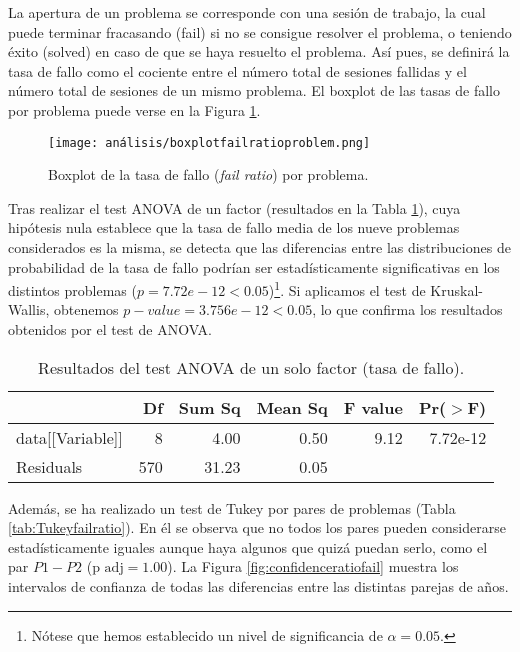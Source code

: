 La apertura de un problema se corresponde con una sesión de trabajo, la cual puede terminar fracasando (fail) si no se consigue resolver el problema, o teniendo éxito (solved) en caso de que se haya resuelto el problema. Así pues, se definirá la tasa de fallo como el cociente entre el número total de sesiones fallidas y el número total de sesiones de un mismo problema. El boxplot de las tasas de fallo por problema puede verse en la Figura \ref{fig:boxplotfailratio}.

\begin{figure}[H]
    \centering
    \texttt{[image: análisis/boxplotfailratioproblem.png]}
    \caption{Boxplot de la tasa de fallo (\emph{fail ratio}) por problema.}
    \label{fig:boxplotfailratio}
\end{figure}

Tras realizar el test ANOVA de un factor (resultados en la Tabla \ref{tab:ANOVAfailratio}), cuya hipótesis nula establece que la tasa de fallo media de los nueve problemas considerados es la misma, se detecta que las diferencias entre las distribuciones de probabilidad de la tasa de fallo  podrían ser estadísticamente significativas en los distintos problemas ($p = 7.72e-12 < 0.05$)\footnote{Nótese que hemos establecido un nivel de significancia de $\alpha = 0.05$.}. Si aplicamos el test de Kruskal-Wallis, obtenemos $p-value = 3.756e-12 < 0.05$, lo que confirma los resultados obtenidos por el test de ANOVA.

\begin{table}[H]
\centering
\caption{Resultados del test ANOVA de un solo factor (tasa de fallo).}
\label{tab:ANOVAfailratio}
\begin{tabular}{lrrrrr}
  \hline
 & Df & Sum Sq & Mean Sq & F value & Pr($>$F) \\ 
  \hline
data[[Variable]] & 8 & 4.00 & 0.50 & 9.12 & 7.72e-12 \\ 
  Residuals        & 570 & 31.23 & 0.05 &  &  \\ 
   \hline
\end{tabular}
\end{table}

Además, se ha realizado un test de Tukey por pares de problemas (Tabla \ref{tab:Tukeyfailratio}). En él se observa que no todos los pares pueden considerarse estadísticamente iguales aunque haya algunos que quizá puedan serlo, como el par $P1-P2$ ($\text{p adj} = 1.00$). La Figura \ref{fig:confidenceratiofail} muestra los intervalos de confianza de todas las diferencias entre las distintas parejas de años.


